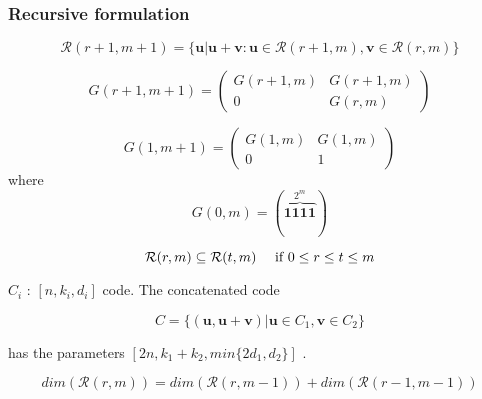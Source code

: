 \documentclass{beamer}
\newcommand{\RM}[2]{\ensuremath{\mathcal{R}(#1,#2)}}
\newcommand{\V}[1]{\ensuremath{\mathbf{#1}}}
\begin{document}

\begin{frame}
 \frametitle{Recursive formulation}
\begin{theorem}
\begin{equation*} \RM{r+1}{m+1} =  \{ \V{u} | \V{u}+\V{v} : \V{u} \in \RM{r+1}{m}, \V{v} \in \RM{r}{m} \} \end{equation*}
\end{theorem}

\begin{equation}
G(r+1,m+1) = \begin{pmatrix}
G(r+1,m) & G(r+1,m) \\
0 & G(r,m) 
\end{pmatrix}
\end{equation}

\begin{equation}
G(1,m+1) = \begin{pmatrix}
G(1,m) & G(1,m) \\
0 & 1
\end{pmatrix}
\end{equation}
where
\begin{equation*}
  G(0,m) = ( {\overbrace{\V{1111}}^{2^m}} )
\end{equation*}


\end{frame}


\begin{frame}
 \begin{theorem}
\begin{equation*}
\RM{r}{m} \subseteq \RM{t}{m} \quad
\text{ if } 0 \leq r \leq t \leq m \\
\end{equation*}
\end{theorem}

\begin{theorem}
\label{general}
$C_i$ : $[n,k_i,d_i]$ code. The concatenated code

  \begin{equation*}
    C = \{(\V{u},\V{u}+\V{v}) | \V{u} \in C_1 , \V{v} \in C_2 \}
  \end{equation*}

has the parameters $[2n,k_1+k_2, min\{2d_1,d_2\}]$ .
\end{theorem}

\begin{obs}
  \label{eq:1}
  \begin{equation*}
      dim(\RM{r}{m}) = dim(\RM{r}{m-1}) + dim(\RM{r-1}{m-1})
  \end{equation*}
\end{obs}

\end{frame}
\end{document}
